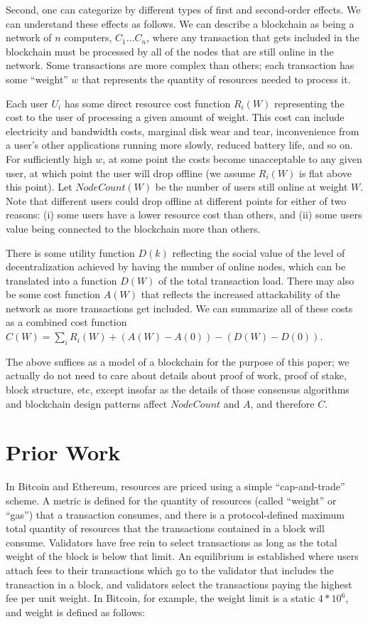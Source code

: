 \documentclass[12pt, final]{article}
\begin{document}
Second, one can categorize by different types of first and second-order effects. We can understand these effects as follows. We can describe a blockchain as being a network of $n$ computers, $C_1 ... C_n$, where any transaction that gets included in the blockchain must be processed by all of the nodes that are still online in the network. Some transactions are more complex than others; each transaction has some ``weight'' $w$ that represents the quantity of resources needed to process it.

Each user $U_i$ has some direct resource cost function $R_i(W)$ representing the cost to the user of processing a given amount of weight. This cost can include electricity and bandwidth costs, marginal disk wear and tear, inconvenience from a user's other applications running more slowly, reduced battery life, and so on. For sufficiently high $w$, at some point the costs become unacceptable to any given user, at which point the user will drop offline (we assume $R_i(W)$ is flat above this point). Let $NodeCount(W)$ be the number of users still online at weight $W$. Note that different users could drop offline at different points for either of two reasons: (i) some users have a lower resource cost than others, and (ii) some users value being connected to the blockchain more than others.

There is some utility function $D(k)$ reflecting the social value of the level of decentralization achieved by having the number of online nodes, which can be translated into a function $D(W)$ of the total transaction load. There may also be some cost function $A(W)$ that reflects the increased attackability of the network as more transactions get included. We can summarize all of these costs as a combined cost function $C(W) = \sum_i R_i(W) + (A(W) - A(0)) - (D(W) - D(0))$.

The above suffices as a model of a blockchain for the purpose of this paper; we actually do not need to care about details about proof of work, proof of stake, block structure, etc, except insofar as the details of those consensus algorithms and blockchain design patterns affect $NodeCount$ and $A$, and therefore $C$.

\section{Prior Work}

In Bitcoin and Ethereum, resources are priced using a simple ``cap-and-trade'' scheme. A metric is defined for the quantity of resources (called ``weight'' or ``gas'') that a transaction consumes, and there is a protocol-defined maximum total quantity of resources that the transactions contained in a block will consume. Validators have free rein to select transactions as long as the total weight of the block is below that limit. An equilibrium is established where users attach fees to their transactions which go to the validator that includes the transaction in a block, and validators select the transactions paying the highest fee per unit weight. In Bitcoin, for example, the weight limit is a static $4 *10^6$, and weight is defined as follows\cite{weightunits}:
\end{document}
